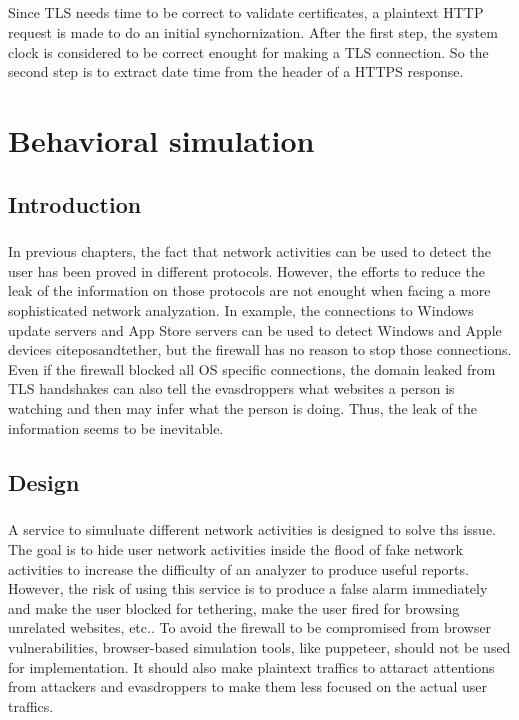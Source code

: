 \documentclass[mscthesis]{usiinfthesis}
\begin{document}
\paragraph{}
Since TLS needs time to be correct to validate certificates, a plaintext HTTP request is made to do an initial synchornization. After the first step, the system clock is considered to be correct enought for making a TLS connection. So the second step is to extract date time from the header of a HTTPS response.

\chapter{Behavioral simulation}
\section{Introduction}
\paragraph{}
In previous chapters, the fact that network activities can be used to detect the user has been proved in different protocols. However, the efforts to reduce the leak of the information on those protocols are not enought when facing a more sophisticated network analyzation. In example, the connections to Windows update servers and App Store servers can be used to detect Windows and Apple devices citep{osandtether}, but the firewall has no reason to stop those connections. Even if the firewall blocked all OS specific connections, the domain leaked from TLS handshakes can also tell the evasdroppers what websites a person is watching and then may infer what the person is doing. Thus, the leak of the information seems to be inevitable.

\section{Design}
\paragraph{}
A service to simuluate different network activities is designed to solve ths issue. The goal is to hide user network activities inside the flood of fake network activities to increase the difficulty of an analyzer to produce useful reports. However, the risk of using this service is to produce a false alarm immediately and make the user blocked for tethering, make the user fired for browsing unrelated websites, etc.. To avoid the firewall to be compromised from browser vulnerabilities, browser-based simulation tools, like puppeteer, should not be used for implementation. It should also make plaintext traffics to attaract attentions from attackers and evasdroppers to make them less focused on the actual user traffics.
\end{document}
